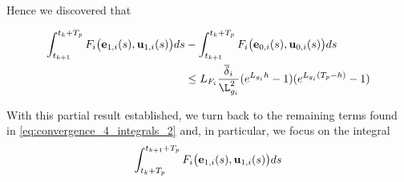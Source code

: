 Hence we discovered that
\begin{bw_box}
\begin{align}
  \int_{t_{k+1}}^{t_k + T_p} F_i \big(\vect{e}_{1,i}(s), \vect{u}_{1,i} (s)\big) d s
  &- \int_{t_{k+1}}^{t_k + T_p} F_i \big(\vect{e}_{0,i}(s), \vect{u}_{0,i} (s)\big) d s \\
  & \leq L_{F_i} \dfrac{\overline{\delta}_i}{\L_{g_i}^2} (e^{L_{g_i} h} - 1) (e^{L_{g_i}(T_p-h)} - 1)
\label{eq:end_result_two_integrals}
\end{align}
\end{bw_box}

With this partial result established, we turn back to the remaining terms
found in \eqref{eq:convergence_4_integrals_2} and, in particular, we focus on
the integral
\begin{align}
  \int_{t_k + T_p}^{t_{k+1} + T_p} F_i \big(\bm{\mathbf{e}}_{1,i}(s), \bm{\mathbf{u}}_{1,i} (s)\big) d s
\end{align}
